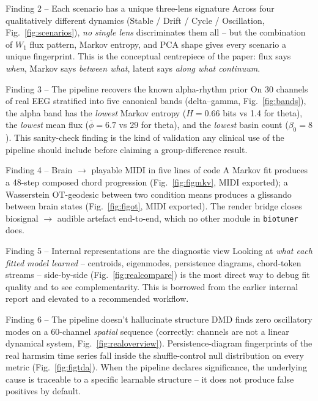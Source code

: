 \documentclass[11pt,a4paper]{article}
\begin{document}
\begin{headlinebox}{Finding 2 -- Each scenario has a unique three-lens signature}
Across four qualitatively different dynamics (Stable / Drift / Cycle
/ Oscillation, Fig.~\ref{fig:scenarios}), \emph{no single lens}
discriminates them all -- but the combination of $W_1$ flux pattern,
Markov entropy, and PCA shape gives every scenario a unique
fingerprint. This is the conceptual centrepiece of the paper:
flux says \emph{when}, Markov says \emph{between what}, latent says
\emph{along what continuum}.
\end{headlinebox}

\begin{headlinebox}{Finding 3 -- The pipeline recovers the known alpha-rhythm prior}
On 30 channels of real EEG stratified into five canonical bands
(delta--gamma, Fig.~\ref{fig:bands}), the alpha band has the
\emph{lowest} Markov entropy ($H = 0.66$ bits vs 1.4 for theta), the
\emph{lowest} mean flux ($\bar\phi = 6.7$ vs 29 for theta), and the
\emph{lowest} basin count ($\beta_0 = 8$). This sanity-check finding
is the kind of validation any clinical use of the pipeline should
include before claiming a group-difference result.
\end{headlinebox}

\begin{headlinebox}{Finding 4 -- Brain $\to$ playable MIDI in five lines of code}
A Markov fit produces a 48-step composed chord progression
(Fig.~\ref{fig:figmkv}, MIDI exported); a Wasserstein OT-geodesic
between two condition means produces a glissando between brain
states (Fig.~\ref{fig:figot}, MIDI exported). The render bridge
closes biosignal $\to$ audible artefact end-to-end, which no other
module in \texttt{biotuner} does.
\end{headlinebox}

\begin{headlinebox}{Finding 5 -- Internal representations are the diagnostic view}
Looking at \emph{what each fitted model learned} -- centroids,
eigenmodes, persistence diagrams, chord-token streams --
side-by-side (Fig.~\ref{fig:realcompare}) is the most direct way to
debug fit quality and to see complementarity. This is borrowed from
the earlier internal report and elevated to a recommended workflow.
\end{headlinebox}

\begin{headlinebox}{Finding 6 -- The pipeline doesn't hallucinate structure}
DMD finds zero oscillatory modes on a 60-channel \emph{spatial}
sequence (correctly: channels are not a linear dynamical system,
Fig.~\ref{fig:realoverview}). Persistence-diagram fingerprints of
the real harmsim time series fall inside the shuffle-control null
distribution on every metric (Fig.~\ref{fig:figtda}). When the
pipeline declares significance, the underlying cause is traceable
to a specific learnable structure -- it does not produce false
positives by default.
\end{headlinebox}
\end{document}
